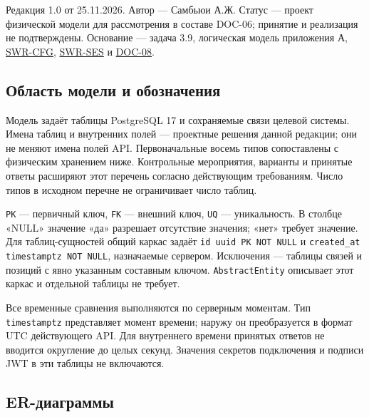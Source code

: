\documentclass[12pt,a4paper]{article}
\begin{document}
Редакция 1.0 от 25.11.2026. Автор --- Самбьюи А.Ж. Статус --- проект физической модели для рассмотрения в составе DOC-06; принятие и реализация не подтверждены. Основание --- задача 3.9, логическая модель приложения А, {\hyperlink{конфигурации-контрольные-мероприятия-и-модерация}{SWR-CFG}}, {\href{DOC-06.2\_Сессии\_задач\_и\_планировщик.pdf\#doc-062-сессии-задач-и-планировщик}{SWR-SES}} и {\href{../09\_Архитектура\_и\_API/DOC-08\_Справочник\_API.pdf\#doc-08-справочник-api-платформы}{DOC-08}}.

\subsection{Область модели и обозначения}\label{ux43eux431ux43bux430ux441ux442ux44c-ux43cux43eux434ux435ux43bux438-ux438-ux43eux431ux43eux437ux43dux430ux447ux435ux43dux438ux44f}

\hypertarget{область-модели-и-обозначения}{}

Модель задаёт таблицы PostgreSQL 17 и сохраняемые связи целевой системы. Имена таблиц и внутренних полей --- проектные решения данной редакции; они не меняют имена полей API. Первоначальные восемь типов сопоставлены с физическим хранением ниже. Контрольные мероприятия, варианты и принятые ответы расширяют этот перечень согласно действующим требованиям. Число типов в исходном перечне не ограничивает число таблиц.

\texttt{PK} --- первичный ключ, \texttt{FK} --- внешний ключ, \texttt{UQ} --- уникальность. В столбце «NULL» значение «да» разрешает отсутствие значения; «нет» требует значение. Для таблиц-сущностей общий каркас задаёт \texttt{id\ uuid\ PK\ NOT\ NULL} и \texttt{created\_\allowbreak{}at timestamptz NOT NULL}, назначаемые сервером. Исключения --- таблицы связей и позиций с явно указанным составным ключом. \texttt{Abstract\allowbreak{}Entity} описывает этот каркас и отдельной таблицы не требует.

Все временные сравнения выполняются по серверным моментам. Тип \texttt{timestamptz} представляет момент времени; наружу он преобразуется в формат UTC действующего API. Для внутреннего времени принятых ответов не вводится округление до целых секунд. Значения секретов подключения и подписи JWT в эти таблицы не включаются.

\subsection{ER-диаграммы}\label{er-ux434ux438ux430ux433ux440ux430ux43cux43cux44b}
\end{document}
